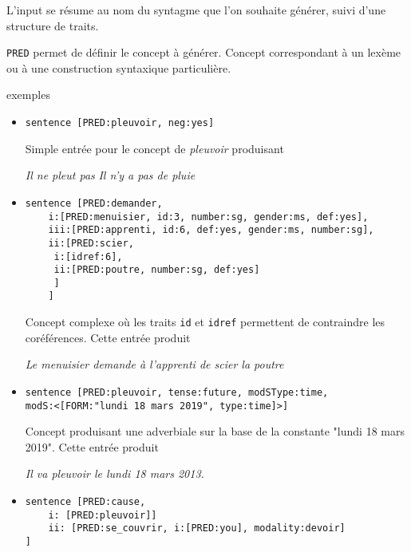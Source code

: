 \documentclass[11pt]{article}
\begin{document}
L'input se résume au nom du syntagme que l'on souhaite générer, suivi d'une
structure de traits.

\texttt{PRED} permet de définir le concept à générer. Concept
correspondant à un lexème ou à une construction syntaxique particulière.

exemples

\begin{itemize}
\item 
\begin{verbatim}
sentence [PRED:pleuvoir, neg:yes]
\end{verbatim}

Simple entrée pour le concept de \textit{pleuvoir} produisant 
\begin{exe}
\ex \begin{xlist} 
\ex \textit{Il ne pleut pas}
\ex \textit{Il n'y a pas de pluie}
\end{xlist}
\end{exe}


\item 
\begin{verbatim}
sentence [PRED:demander,
    i:[PRED:menuisier, id:3, number:sg, gender:ms, def:yes],
    iii:[PRED:apprenti, id:6, def:yes, gender:ms, number:sg],
    ii:[PRED:scier,
	 i:[idref:6],
	 ii:[PRED:poutre, number:sg, def:yes]
	 ]
    ]
\end{verbatim}

Concept complexe où les traits \texttt{id} et \texttt{idref}
permettent de contraindre les coréférences. 
Cette entrée produit 

\begin{exe}
\ex \textit{Le menuisier demande à l'apprenti de scier la
poutre}
\end{exe}

\item 
\begin{verbatim}
sentence [PRED:pleuvoir, tense:future, modSType:time, 
modS:<[FORM:"lundi 18 mars 2019", type:time]>]
\end{verbatim}

Concept produisant une adverbiale sur la base de la
constante "lundi 18 mars 2019". Cette entrée produit 

\begin{exe}
\ex \textit{Il va pleuvoir le lundi 18 mars 2013.}
\end{exe}

\item 
\begin{verbatim}
sentence [PRED:cause, 
    i: [PRED:pleuvoir]]
    ii: [PRED:se_couvrir, i:[PRED:you], modality:devoir]
]
\end{verbatim}


\end{itemize}
\end{document}
